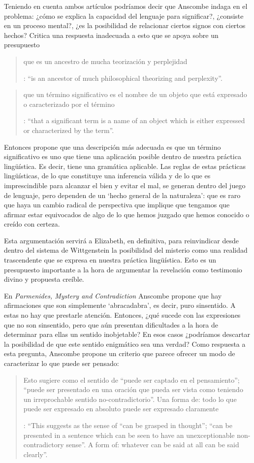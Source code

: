Teniendo en cuenta ambos artículos podríamos decir que Anscombe indaga en el problema: ¿cómo se explica la capacidad del lenguaje para significar?, ¿consiste en un proceso mental?, ¿es la posibilidad de relacionar ciertos signos con ciertos hechos? Critica una respuesta inadecuada a esto que se apoya sobre un presupuesto \blockquote[{\cite[xi]{anscombe1981parmenides}}: \enquote{is an ancestor of much philosophical theorizing and perplexity}.]{que es un ancestro de mucha teorización y perplejidad}: \blockquote[{\cite[x]{anscombe1981parmenides}}: \enquote{that a significant term is a name of an object which is either expressed or characterized by the term}.]{que un término significativo es el nombre de un objeto que está expresado o caracterizado por el término}. Entonces propone que una descripción más adecuada es que un término significativo es uno que tiene una aplicación posible dentro de nuestra práctica lingüística. Es decir, tiene una gramática aplicable. Las reglas de estas prácticas lingüísticas, de lo que constituye una inferencia válida y de lo que es imprescindible para alcanzar el bien y evitar el mal, se generan dentro del juego de lenguaje, pero dependen de un `hecho general de la naturaleza':  que es raro que haya un cambio radical de perspectiva que implique que tengamos que afirmar estar equivocados de algo de lo que hemos juzgado que hemos conocido o creído con certeza.

Esta argumentación servirá a Elizabeth, en definitiva, para reinvindicar desde dentro del sistema de Wittgenstein la posibilidad del misterio como una realidad trascendente que se expresa en nuestra práctica lingüística. Esto es un presupuesto importante a la hora de argumentar la revelación como testimonio divino y propuesta creíble.

En \emph{Parmenides, Mystery and Contradiction} Anscombe propone que hay afirmaciones que son simplemente `abracadabra', es decir, puro sinsentido. A estas no hay que prestarle atención. Entonces, ¿qué sucede con las expresiones que no son sinsentido, pero que aún presentan dificultades a la hora de determinar para ellas un sentido inobjetable? En esos casos ¿podríamos descartar la posibilidad de que este sentido enigmático sea una verdad? Como respuesta a esta pregunta, Anscombe propone un criterio que parece ofrecer un modo de caracterizar lo que puede ser pensado: \blockquote[{\Cite[8]{anscombe1981parmenides:pmc}}: \enquote{This suggests as the sense of ``can be grasped in thought''; ``can be presented in a sentence which can be seen to have an unexceptionable non-contradictory sense''. A form of: whatever can be said at all can be said clearly}.]{Esto sugiere como el sentido de ``puede ser captado en el pensamiento''; ``puede ser presentado en una oración que pueda ser vista como teniendo un irreprochable sentido no-contradictorio''. Una forma de: todo lo que puede ser expresado en absoluto puede ser expresado claramente}.

